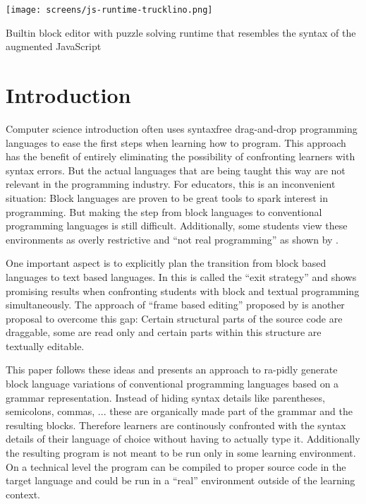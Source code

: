 \documentclass[sigconf,natbib=false]{acmart}
\newcommand{\enquote}[1]{``#1''}
\begin{document}
\begin{teaserfigure}
  \centering\texttt{[image: screens/js-runtime-trucklino.png]}
  \caption{Builtin block editor with puzzle solving runtime that resembles the syntax of the augmented JavaScript}
  \label{fig:js-runtime-trucklino}
\end{teaserfigure}

\maketitle

\section{Introduction}

Computer science introduction often uses syntaxfree drag-and-drop programming languages to ease the first steps when learning how to program. This approach has the benefit of entirely eliminating the possibility of confronting learners with syntax errors. But the actual languages that are being taught this way are not relevant in the programming industry. For educators, this is an inconvenient situation: Block languages are proven to be great tools to spark interest in programming. But making the step from block languages to conventional programming languages is still difficult. Additionally, some students view these environments as overly restrictive and \enquote{not real programming} as shown by \cite{braune_learning_2020}.

One important aspect is to explicitly plan the transition from block based languages to text based languages. In \cite{fraser_ten_2015} this is called the \enquote{exit strategy} and \cite{alrubaye_comparison_2019} shows promising results when confronting students with block and textual programming simultaneously. The approach of \enquote{frame based editing} proposed by \cite{kolling_frame-based_2015} is another proposal to overcome this gap: Certain structural parts of the source code are draggable, some are read only and certain parts within this structure are textually editable.

This paper follows these ideas and presents an approach to ra-pidly generate block language variations of conventional programming languages based on a grammar representation. Instead of hiding syntax details like parentheses, semicolons, commas, ... these are organically made part of the grammar and the resulting blocks. Therefore learners are continously confronted with the syntax details of their language of choice without having to actually type it. Additionally the resulting program is not meant to be run only in some learning environment. On a technical level the program can be compiled to proper source code in the target language and could be run in a \enquote{real} environment outside of the learning context.
\end{document}
